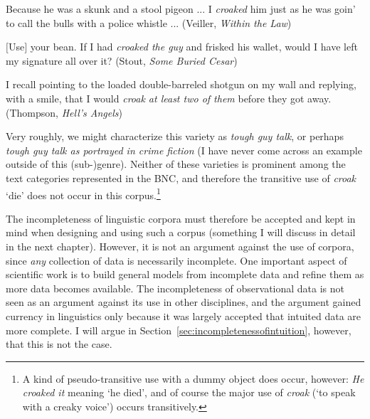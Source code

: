 \begin{exe}
\ex
\begin{xlist}
\label{ex:croaksb}

\ex Because he was a skunk and a stool pigeon ... I \textit{croaked} him just as he was goin' to call the bulls with a police whistle ... (Veiller, \textit{Within the Law})

\ex $[$Use$]$ your bean. If I had \textit{croaked the guy} and frisked his wallet, would I have left my signature all over it? (Stout, \textit{Some Buried Cesar})

\ex I recall pointing to the loaded double\hyp{}barreled shotgun on my wall and replying, with a smile, that I would \textit{croak at least two of them} before they got away. (Thompson, \textit{Hell's Angels})

\end{xlist}
\end{exe}

Very roughly, we might characterize this variety as \textit{tough guy talk}, or perhaps \textit{tough guy talk as portrayed in crime fiction}  (I have never come across an example outside of this (sub-)genre).  Neither of these varieties  is prominent among the text categories  represented in the BNC,  and therefore the transitive  use of \textit{croak} `die' does not occur in this corpus.\footnote{A kind of pseudo\hyp{}transitive use with a dummy object does occur, however: \textit{He croaked it} meaning `he died', and of course the major use of \textit{croak} (`to speak with a creaky voice') occurs transitively.}

The incompleteness of linguistic corpora must therefore be accepted and kept in mind when designing  and using such a corpus (something I will discuss in detail in the next chapter). However, it is not an argument against the use of corpora, since \emph{any} collection of data is necessarily incomplete. One important aspect of scientific work is to build general models from incomplete data and refine them as more data becomes available. The incompleteness of observational  data is not seen as an argument against its use in other disciplines, and the argument gained currency in linguistics only because it was largely accepted that intuited  data are more complete. I will argue in Section~\ref{sec:incompletenessofintuition}, however, that this is not the case.

